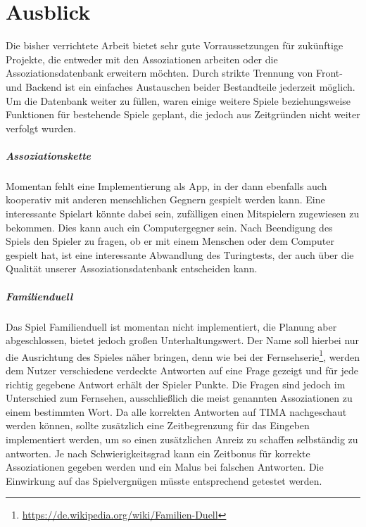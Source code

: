\chapter{Ausblick}\label{ch:ausblick}

Die bisher verrichtete Arbeit bietet sehr gute Vorraussetzungen für zukünftige Projekte, die entweder mit den Assoziationen arbeiten oder die Assoziationsdatenbank erweitern möchten. Durch strikte Trennung von Front- und Backend ist ein einfaches Austauschen beider Bestandteile jederzeit möglich.
Um die Datenbank weiter zu füllen, waren einige weitere Spiele beziehungsweise Funktionen für bestehende Spiele geplant, die jedoch aus Zeitgründen nicht weiter verfolgt wurden.

\paragraph{Assoziationskette}
Momentan fehlt eine Implementierung als App, in der dann ebenfalls auch kooperativ mit anderen menschlichen Gegnern gespielt werden kann. Eine interessante Spielart könnte dabei sein, zufälligen einen Mitspielern zugewiesen zu bekommen. Dies kann auch ein Computergegner sein. Nach Beendigung des Spiels den Spieler zu fragen, ob er mit einem Menschen oder dem Computer gespielt hat, ist eine interessante Abwandlung des Turingtests, der auch über die Qualität unserer Assoziationsdatenbank entscheiden kann.

\paragraph{Familienduell}
Das Spiel Familienduell ist momentan nicht implementiert, die Planung aber abgeschlossen, bietet jedoch großen Unterhaltungswert. Der Name soll hierbei nur die Ausrichtung des Spieles näher bringen,
denn wie bei der
Fernsehserie\footnote{\url{https://de.wikipedia.org/wiki/Familien-Duell}},
werden dem Nutzer verschiedene verdeckte Antworten auf eine Frage gezeigt
und für jede richtig gegebene Antwort erhält der Spieler Punkte.
Die Fragen sind jedoch im Unterschied zum Fernsehen, ausschließlich die meist
genannten Assoziationen zu einem bestimmten Wort. Da alle korrekten Antworten auf TIMA nachgeschaut werden können, sollte zusätzlich eine
Zeitbegrenzung für das Eingeben implementiert werden, um so einen zusätzlichen Anreiz zu schaffen selbständig zu antworten. Je nach Schwierigkeitsgrad kann ein Zeitbonus für korrekte Assoziationen
gegeben werden und ein Malus bei falschen Antworten. Die Einwirkung auf das
Spielvergnügen müsste entsprechend getestet werden.


